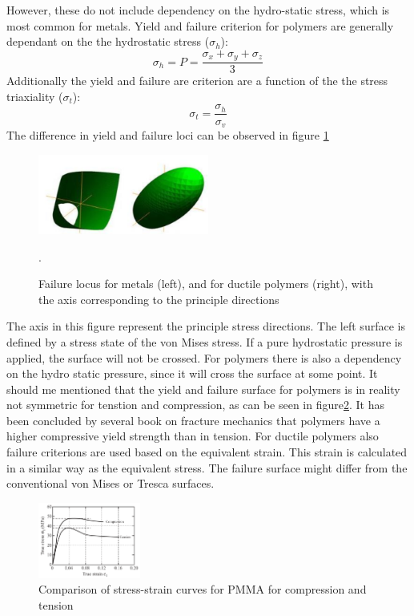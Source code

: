 However, these do not include dependency on the hydro-static stress, which is most common for metals. Yield and failure criterion for polymers are generally dependant on the the hydrostatic stress ($\sigma_h$):
\begin{equation} \label{eqn:Me}
  \sigma_h=P=\frac{\sigma_x+\sigma_y+\sigma_z}{3}
\end{equation}
Additionally the yield and failure are criterion are a function of the the stress triaxiality ($\sigma_t$):
\begin{equation}\label{AzziTsai}
\sigma_t=\frac{\sigma_h}{\sigma_v}
\end{equation}
The difference in yield and failure loci can be observed in figure \ref{fig:yieldloci}
\begin{figure}[H]
    \centering
    \includegraphics[width=0.5\textwidth]{chapter_2/figures/yieldloci.png}
    \caption{Failure locus for metals (left), and for ductile polymers (right), with the axis corresponding to the principle directions \cite{Christensen2013TheFailure}}.
    \label{fig:yieldloci}
\end{figure}
The axis in this figure represent the principle stress directions. The left surface is defined by a stress state of the von Mises stress. If a pure hydrostatic pressure is applied, the surface will not be crossed. For polymers there is also a dependency on the hydro static pressure, since it  will cross the surface at some point.  
It should me mentioned that the yield and failure surface for polymers is in reality not symmetric for tenstion and compression, as can be seen in figure\ref{fig:SStensioncompression}. It has been concluded by several book on fracture mechanics \cite{Janssen2014Co-magmeasurewD.pdf} that polymers have a higher compressive yield strength than in tension. 
For ductile polymers also failure criterions are used based on the equivalent strain. This strain is calculated in a similar way as the equivalent stress. The failure surface might differ from the conventional von Mises or Tresca surfaces. 
\begin{figure}[H]
    \centering
    \includegraphics[width=0.3\textwidth]{chapter_2/figures/SStensioncompression.png}
    \caption{Comparison of stress-strain curves for PMMA for compression and tension \cite{Halary2011PolymerMaterials}}
    \label{fig:SStensioncompression}
\end{figure}

